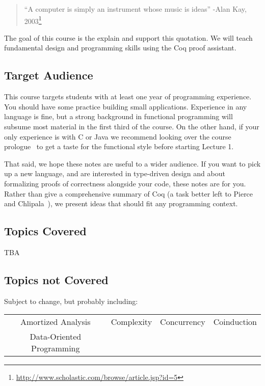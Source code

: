 \documentclass{article}
\begin{document}
\maketitle

\begin{quote}
  ``A computer is simply an instrument whose music is ideas'' -Alan Kay, 2003\footnote{\url{http://www.scholastic.com/browse/article.jsp?id=5}}
\end{quote}

The goal of this course is the explain and support this quotation.
We will teach fundamental design and programming skills using the Coq proof assistant.

\subsection*{Target Audience}
This course targets students with at least one year of programming experience.
You should have some practice building small applications.
Experience in any language is fine, but a strong background in functional programming will subsume most material in the first third of the course.
On the other hand, if your only experience is with C or Java we recommend looking over the course prologue~\cite{TODO} to get a taste for the functional style before starting Lecture 1.

That said, we hope these notes are useful to a wider audience.
If you want to pick up a new language, and are interested in type-driven design and about formalizing proofs of correctness alongside your code, these notes are for you.
Rather than give a comprehensive summary of Coq (a task better left to Pierce and Chlipala~\cite{TODO}), we present ideas that should fit any programming context.

\subsection*{Topics Covered}
TBA

\subsection*{Topics not Covered}
Subject to change, but probably including:

\begin{center}
  \begin{tabular}{c c c c}
    Amortized Analysis & Complexity & Concurrency & Coinduction
  \\Data-Oriented Programming & & &
  \end{tabular}
\end{center}
\end{document}
